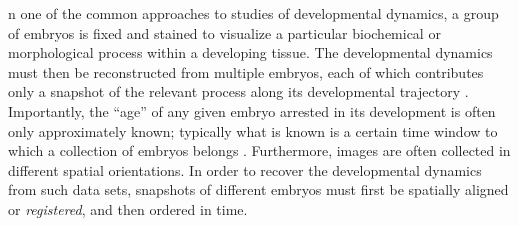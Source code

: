 \documentclass{pnastwo}
\begin{document}
\begin{article}






n one of the common approaches to studies of developmental dynamics, a group of embryos is fixed and stained to visualize a particular biochemical or morphological process within a developing tissue. 
%
The developmental dynamics must then be reconstructed from multiple embryos, each of which contributes only a snapshot of the relevant process along its developmental trajectory \cite{jaeger2004dynamic, peter2011gene, fowlkes2008quantitative}.
%
Importantly, the ``age'' of any given embryo arrested in its development is often only approximately known; typically what is known is
a certain time window to which a collection of embryos belongs \cite{ng2012large, richardson2014emage, castro2009automatic}.
%
Furthermore, images are often collected in different spatial orientations.
%
In order to recover the developmental dynamics from such data sets, snapshots of different embryos must first be spatially aligned or {\em registered}, and then ordered in time.
%



\end{article}
\end{document}

